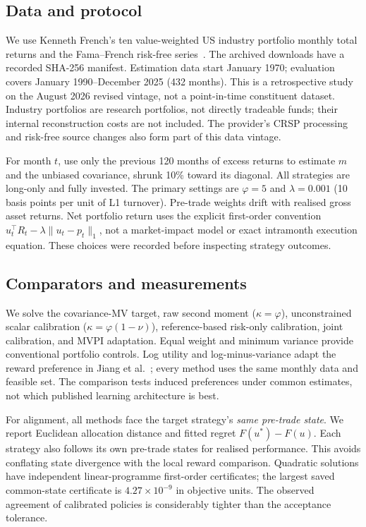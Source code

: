 \documentclass[sigconf,anonymous,review,pbalance]{acmart}
\begin{document}
\subsection{Data and protocol}
We use Kenneth French's ten value-weighted US industry portfolio monthly total returns and the Fama--French risk-free series\ \cite{french}. The archived downloads have a recorded SHA-256 manifest. Estimation data start January 1970; evaluation covers January 1990--December 2025 (432 months). This is a retrospective study on the August 2026 revised vintage, not a point-in-time constituent dataset. Industry portfolios are research portfolios, not directly tradeable funds; their internal reconstruction costs are not included. The provider's CRSP processing and risk-free source changes also form part of this data vintage.

For month $t$, use only the previous 120 months of excess returns to estimate $m$ and the unbiased covariance, shrunk 10\% toward its diagonal. All strategies are long-only and fully invested. The primary settings are $\varphi=5$ and $\lambda=0.001$ (10 basis points per unit of L1 turnover). Pre-trade weights drift with realised gross asset returns. Net portfolio return uses the explicit first-order convention $u_t^\top R_t-\lambda\|u_t-p_t\|_1$, not a market-impact model or exact intramonth execution equation. These choices were recorded before inspecting strategy outcomes.

\subsection{Comparators and measurements}
We solve the covariance-MV target, raw second moment ($\kappa=\varphi$), unconstrained scalar calibration ($\kappa=\varphi(1-\nu)$), reference-based risk-only calibration, joint calibration, and MVPI adaptation. Equal weight and minimum variance provide conventional portfolio controls. Log utility and log-minus-variance adapt the reward preference in Jiang et al.\ \cite{jiang2025}; every method uses the same monthly data and feasible set. The comparison tests induced preferences under common estimates, not which published learning architecture is best.

For alignment, all methods face the target strategy's \emph{same pre-trade state}. We report Euclidean allocation distance and fitted regret $F(u^*)-F(u)$. Each strategy also follows its own pre-trade states for realised performance. This avoids conflating state divergence with the local reward comparison. Quadratic solutions have independent linear-programme first-order certificates; the largest saved common-state certificate is $4.27\times10^{-9}$ in objective units. The observed agreement of calibrated policies is considerably tighter than the acceptance tolerance.
\end{document}
